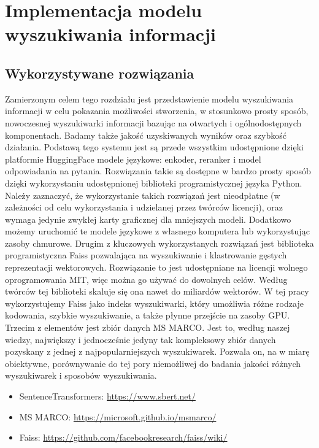 \chapter{Implementacja modelu wyszukiwania informacji}
\label{chap:czwarty}

\section{Wykorzystywane rozwiązania}

Zamierzonym celem tego rozdziału jest przedstawienie modelu wyszukiwania informacji w celu pokazania możliwości stworzenia, w stosunkowo prosty sposób, nowoczesnej wyszukiwarki informacji bazując na otwartych i ogólnodostępnych komponentach. Badamy także jakość uzyskiwanych wyników oraz szybkość działania. Podstawą tego systemu jest są przede wszystkim udostępnione dzięki platformie HuggingFace modele językowe: enkoder, reranker i model odpowiadania na pytania. Rozwiązania takie są dostępne w bardzo prosty sposób dzięki wykorzystaniu udostępnionej biblioteki programistycznej języka Python. Należy zaznaczyć, że wykorzystanie takich rozwiązań jest nieodpłatne (w zależności od celu wykorzystania i udzielanej przez twórców licencji), oraz wymaga jedynie zwykłej karty graficznej dla mniejszych modeli. Dodatkowo możemy uruchomić te modele językowe z własnego komputera lub wykorzystując zasoby chmurowe. Drugim z kluczowych wykorzystanych rozwiązań jest biblioteka programistyczna Faiss pozwalająca na wyszukiwanie i klastrowanie gęstych reprezentacji wektorowych. Rozwiązanie to jest udostępniane na licencji wolnego oprogramowania MIT, więc można go używać do dowolnych celów. Według twórców tej biblioteki skaluje się ona nawet do miliardów wektorów. W tej pracy wykorzystujemy Faiss jako indeks wyszukiwarki, który umożliwia różne rodzaje kodowania, szybkie wyszukiwanie, a także płynne przejście na zasoby GPU. Trzecim z elementów jest zbiór danych MS MARCO. Jest to, według naszej wiedzy, największy i jednocześnie jedyny tak kompleksowy zbiór danych pozyskany z jednej z najpopularniejszych wyszukiwarek. Pozwala on, na w miarę obiektywne, porównywanie do tej pory niemożliwej do badania jakości różnych wyszukiwarek i sposobów wyszukiwania.\newline

\begin{itemize}
\item SentenceTransformers: \url{https://www.sbert.net/}\newline
\item MS MARCO: \url{https://microsoft.github.io/msmarco/}\newline
\item Faiss: \url{https://github.com/facebookresearch/faiss/wiki/}\newline
\end{itemize}

